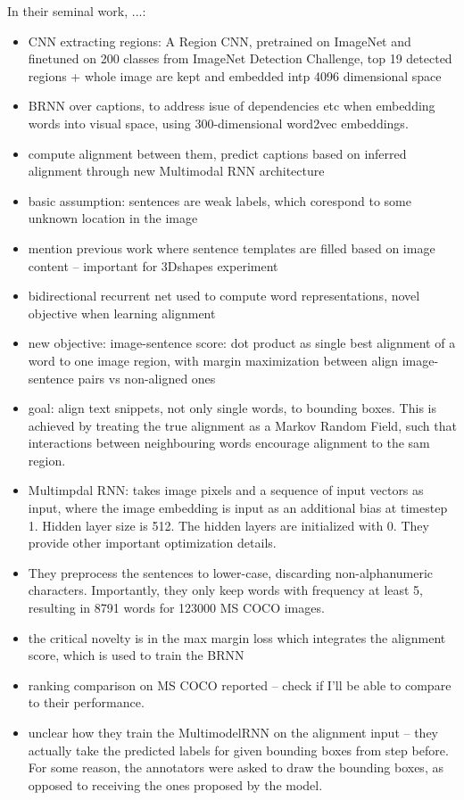 In their seminal work, \cite{karpathy2015deep}...:
\begin{itemize}
	\item CNN extracting regions: A Region CNN, pretrained on ImageNet and finetuned on 200 classes from ImageNet Detection Challenge, top 19 detected regions + whole image are kept and embedded intp 4096 dimensional space
	\item BRNN over captions, to address isue of dependencies etc when embedding words into visual space, using 300-dimensional word2vec embeddings. 
	\item compute alignment between them, predict captions based on inferred alignment through new Multimodal RNN architecture
	\item basic assumption: sentences are weak labels, which corespond to some unknown location in the image
	\item mention previous work where sentence templates are filled based on image content -- important for 3Dshapes experiment
	\item bidirectional recurrent net used to compute word representations, novel objective when learning alignment
	\item new objective: image-sentence score: dot product as single best alignment of a word to one image region, with margin maximization between align image-sentence pairs vs non-aligned ones
	\item goal: align text snippets, not only single words, to bounding boxes. This is achieved by treating the true alignment as a Markov Random Field, such that interactions between neighbouring words encourage alignment to the sam region.
	\item Multimpdal RNN: takes image pixels and a sequence of input vectors as input, where the image embedding is input as an additional bias at timestep 1. Hidden layer size is 512. The hidden layers are initialized with 0. They provide other important optimization details.
	\item They preprocess the sentences to lower-case, discarding non-alphanumeric characters. Importantly, they only keep words with frequency at least 5, resulting in 8791 words for 123000 MS COCO images. 
	\item the critical novelty is in the max margin loss which integrates the alignment score, which is used to train the BRNN
	\item ranking comparison on MS COCO reported -- check if I'll be able to compare to their performance.
	\item unclear how they train the MultimodelRNN on the alignment input -- they actually take the predicted labels for given bounding boxes from step before. For some reason, the annotators were asked to draw the bounding boxes, as opposed to receiving the ones proposed by the model.
\end{itemize}

